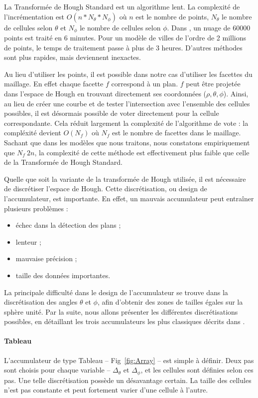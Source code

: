 ﻿\documentclass[12pt, twoside]{article}
\begin{document}
La Transformée de Hough Standard est un algorithme lent. La complexité de l'incrémentation est $O(n*N_{\theta}*N_{\phi})$ où $n$ est le nombre de points, $N_{\theta}$ le nombre de cellules selon $\theta$ et $N_{\phi}$ le nombre de cellules selon $\phi$. Dans \cite{Hough1}, un nuage de 60000 points est traité en 6 minutes. Pour un modèle de villes de l'ordre de 2 millions de points, le temps de traitement passe à plus de 3 heures. D'autres méthodes sont plus rapides, mais deviennent inexactes.

Au lieu d'utiliser les points, il est possible dans notre cas d'utiliser les facettes du maillage. En effet chaque facette $f$ correspond à un plan. $f$ peut être projetée dans l'espace de Hough en trouvant directement ses coordonnées ($\rho, \theta, \phi$). Ainsi, au lieu de créer une courbe et de tester l'intersection avec l'ensemble des cellules possibles, il est désormais possible de voter directement pour la cellule correspondante. Cela réduit largement la complexité de l'algorithme de vote : la compléxité devient $O(N_f)$ où $N_f$ est le nombre de facettes dans le maillage. Sachant que dans les modèles que nous traitons, nous constatons empiriquement que $N_f ~ 2n$, la complexité de cette méthode est effectivement plus faible que celle de la Transformée de Hough Standard.

Quelle que soit la variante de la transformée de Hough utilisée, il est nécessaire de discrétiser l'espace de Hough. Cette discrétisation, ou design de l'accumulateur, est importante. En effet, un mauvais accumulateur peut entraîner plusieurs problèmes :
\begin{itemize}
  \item échec dans la détection des plans ;
  \item lenteur ;
  \item mauvaise précision ;
  \item taille des données importantes.
\end{itemize}
La principale difficulté dans le design de l'accumulateur se trouve dans la discrétisation des angles $\theta$ et $\phi$, afin d'obtenir des zones de tailles égales sur la sphère unité. Par la suite, nous allons présenter les différentes discrétisations possibles, en détaillant les trois accumulateurs les plus classiques décrits dans \cite{Hough2}.

\paragraph{Tableau}
L’accumulateur de type Tableau -- Fig~\ref{fig:Array} -- est simple à définir. Deux pas sont choisis pour chaque variable -- $\Delta_{\theta}$ et $\Delta_{\phi}$, et les cellules sont définies selon ces pas. Une telle discrétisation possède un désavantage certain. La taille des cellules n’est pas constante et peut fortement varier d’une cellule à l’autre.
\end{document}
